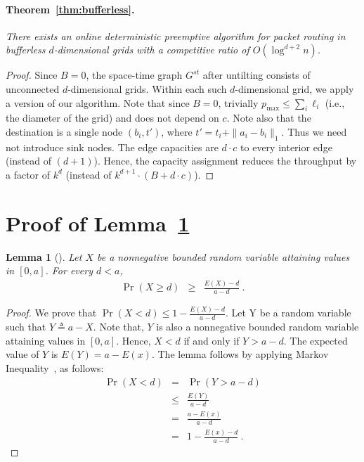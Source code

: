 \documentclass[11pt]{article}
\newtheorem{lemma}[theorem]{Lemma}
\newcommand{\pmax}{p_{\max}}
\newenvironment{proof sketch}[1]{\noindent {\emph{Proof sketch of #1:}}}{\hfill \qed}
\begin{document}
\paragraph{Theorem~\ref{thm:bufferless}.}
  \emph{There exists an online deterministic preemptive algorithm for packet
  routing in bufferless $d$-dimensional grids with a competitive ratio of $O(\log ^{d+2}
  n)$.}
\medskip

\begin{proof}Since $B=0$, the space-time graph $G^{st}$ after untilting
    consists of unconnected $d$-dimensional grids.
Within each such $d$-dimensional grid, we apply a version of our algorithm.  Note that since $B=0$, trivially $\pmax \leq
    \sum_i\ell_i$ (i.e., the diameter of the grid) and does not depend
    on $c$. Note also that the destination is a single node
    $(b_i,t')$, where $t'=t_i+\|a_i-b_i\|_1$. Thus we need not
    introduce sink nodes. The edge capacities are $d \cdot c$ to every interior edge (instead of
    $(d+1)$). Hence, the capacity assignment reduces the throughput by
    a factor of $k^{d}$ (instead of $k^{d+1} \cdot
    (B+d\cdot c)$).
  \end{proof}



\section{Proof of Lemma~\ref{lemma:revMarkov}}\label{sec:RevMarkovproof}
\begin{lemma}[]\label{lemma:revMarkov}
  Let $X$ be a nonnegative bounded random variable attaining values in $[0,a]$. For every $d < a$,
  \begin{eqnarray*}
    \Pr \left(X \geq d \right) & \geq & \frac {E(X)- d}{a- d}\:.
  \end{eqnarray*}
\end{lemma}

\begin{proof}
    We prove that $\Pr \left(X <  d \right)  \leq  1-\frac {E(X)- d}{a- d}$. Let Y be a random variable such that $Y \triangleq a - X$. Note that, $Y$ is also a nonnegative bounded random variable attaining values in $[0,a]$. Hence, $X < d$ if and only if $Y > a-d$. The expected value of $Y$ is $E(Y)=a-E(x)$. The lemma follows by applying Markov Inequality~\cite{MU}, as follows:
    \begin{eqnarray*}
        \Pr \left(X < d \right) & = & \Pr \left(Y > a - d \right) \\
        & \leq & \frac {E(Y)}{a - d}\\
        & = & \frac {a-E(x)}{a - d}\\
        & = & 1- \frac {E(x)- d}{a - d}\:.
  \end{eqnarray*}
\end{proof}
\end{document}
